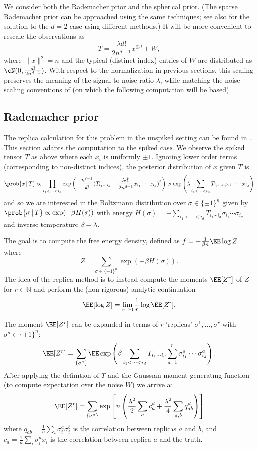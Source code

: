 \documentclass{article}
\begin{document}
We consider both the Rademacher prior and the spherical prior. (The sparse Rademacher prior can be approached using the same techniques; see also \cite{mmse-lowrank} for the solution to the $d=2$ case using different methods.) It will be more convenient to rescale the observations as
$$ T = \frac{\lambda d!}{2 n^{d-1}} x^{\otimes d} + W, $$
where $\|x\|^2 = n$ and the typical (distinct-index) entries of $W$ are distributed as $\cN(0,\frac{d!}{2n^{d-1}})$. With respect to the normalization in previous sections, this scaling preserves the meaning of the signal-to-noise ratio $\lambda$, while matching the noise scaling conventions of \cite{gardner} (on which the following computation will be based).


\subsection{Rademacher prior}

The replica calculation for this problem in the unspiked setting can be found in \cite{gardner}. This section adapts the computation to the spiked case. We observe the spiked tensor $T$ as above where each $x_i$ is uniformly $\pm 1$. Ignoring lower order terms (corresponding to non-distinct indices), the posterior distribution of $x$ given $T$ is
$$\prob{x \,|\, T} \propto \prod_{i_1 < \cdots < i_d} \exp\left(-\frac{n^{d-1}}{d!}(T_{i_1 \cdots i_d} - \frac{\lambda d!}{2n^{d-1}} x_{i_1} \cdots x_{i_d})^2\right)
\propto \exp\left(\lambda \sum_{i_1 < \cdots < i_d} T_{i_1 \cdots i_d} x_{i_1} \cdots x_{i_d} \right)$$
and so we are interested in the Boltzmann distribution over $\sigma \in \{\pm 1\}^n$ given by $\prob{\sigma \,|\, T} \propto \exp(-\beta H(\sigma))$ with energy $H(\sigma) = -\sum_{i_1 < \cdots < i_d} T_{i_1 \cdots i_d} \sigma_{i_1} \cdots \sigma_{i_d}$ and inverse temperature $\beta = \lambda$.

The goal is to compute the free energy density, defined as $f = -\frac{1}{\beta n} \EE \log Z$ where $$Z = \sum_{\sigma \in \{\pm 1\}^n} \exp(-\beta H(\sigma)).$$
The idea of the replica method is to instead compute the moments $\EE[Z^r]$ of $Z$ for $r \in \mathbb{N}$ and perform the (non-rigorous) analytic continuation
\begin{equation}
\label{eq:replica-trick}
\EE[\log Z] = \lim_{r \to 0} \frac{1}{r} \log \EE[Z^r].
\end{equation}

The moment $\EE[Z^r]$ can be expanded in terms of $r$ `replicas' $\sigma^1,\ldots,\sigma^r$ with $\sigma^a \in \{\pm 1\}^n$:
$$\EE[Z^r] = \sum_{\{\sigma^a\}} \EE\exp\left(\beta \sum_{i_1 < \cdots < i_d} T_{i_1 \cdots i_d} \sum_{a=1}^r \sigma_{i_1}^a \cdots \sigma_{i_d}^a\right).$$
After applying the definition of $T$ and the Gaussian moment-generating function (to compute expectation over the noise $W$) we arrive at
$$\EE[Z^r] = \sum_{\{\sigma^a\}} \exp\left[n\left(\frac{\lambda^2}{2} \sum_a c_a^d + \frac{\lambda^2}{4} \sum_{a,b} q_{ab}^d \right)\right]$$
where $q_{ab} = \frac{1}{n} \sum_i \sigma_i^a \sigma_i^b$ is the correlation between replicas $a$ and $b$, and $c_a = \frac{1}{n} \sum_i \sigma_i^a x_i$ is the correlation between replica $a$ and the truth.
\end{document}
